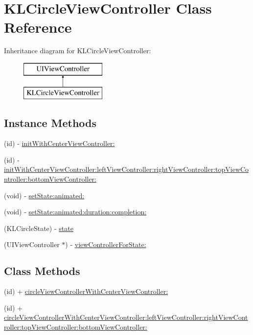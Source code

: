 \hypertarget{interface_k_l_circle_view_controller}{\section{K\-L\-Circle\-View\-Controller Class Reference}
\label{interface_k_l_circle_view_controller}
}
Inheritance diagram for K\-L\-Circle\-View\-Controller\-:\begin{figure}[H]
\begin{center}
\leavevmode
\includegraphics[height=2.000000cm]{interface_k_l_circle_view_controller}
\end{center}
\end{figure}
\subsection*{Instance Methods}
\begin{DoxyCompactItemize}
\item 
(id) -\/ \hyperlink{interface_k_l_circle_view_controller_a92ecb14f17a73634fa6963ec22271b45}{init\-With\-Center\-View\-Controller\-:}
\item 
(id) -\/ \hyperlink{interface_k_l_circle_view_controller_a1947126132f699c62fc90cc2e42bd0ca}{init\-With\-Center\-View\-Controller\-:left\-View\-Controller\-:right\-View\-Controller\-:top\-View\-Controller\-:bottom\-View\-Controller\-:}
\item 
(void) -\/ \hyperlink{interface_k_l_circle_view_controller_a6da91d7845d72cb66626626d8b16db74}{set\-State\-:animated\-:}
\item 
(void) -\/ \hyperlink{interface_k_l_circle_view_controller_a05718fb34669aea6ce79cf00b8a0dc30}{set\-State\-:animated\-:duration\-:completion\-:}
\item 
(K\-L\-Circle\-State) -\/ \hyperlink{interface_k_l_circle_view_controller_a2deadf1aeba65e1c5b624dc54249e134}{state}
\item 
(U\-I\-View\-Controller $\ast$) -\/ \hyperlink{interface_k_l_circle_view_controller_a13b49f50726fb3914642b72664846f44}{view\-Controller\-For\-State\-:}
\end{DoxyCompactItemize}
\subsection*{Class Methods}
\begin{DoxyCompactItemize}
\item 
(id) + \hyperlink{interface_k_l_circle_view_controller_a97e38cbb1a3094d97bea240d8009b02e}{circle\-View\-Controller\-With\-Center\-View\-Controller\-:}
\item 
(id) + \hyperlink{interface_k_l_circle_view_controller_ae7f4e4d29879fd684bb264eadd84bb44}{circle\-View\-Controller\-With\-Center\-View\-Controller\-:left\-View\-Controller\-:right\-View\-Controller\-:top\-View\-Controller\-:bottom\-View\-Controller\-:}
\end{DoxyCompactItemize}
